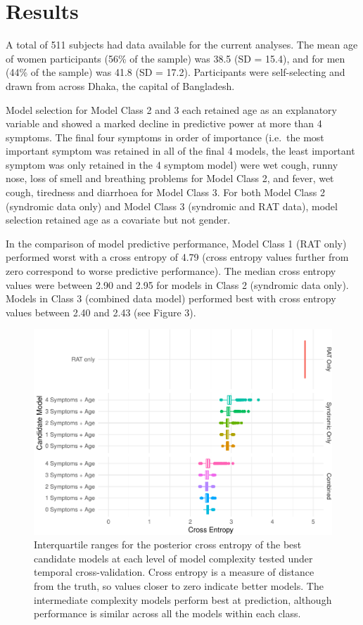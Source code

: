 \documentclass[]{elsarticle} %
\begin{document}
\hypertarget{results}{%
\section{Results}\label{results}}

A total of 511 subjects had data available for the current analyses. The
mean age of women participants (56\% of the sample) was 38.5 (SD =
15.4), and for men (44\% of the sample) was 41.8 (SD = 17.2).
Participants were self-selecting and drawn from across Dhaka, the
capital of Bangladesh.

Model selection for Model Class 2 and 3 each retained age as an
explanatory variable and showed a marked decline in predictive power at
more than 4 symptoms. The final four symptoms in order of importance
(i.e.~the most important symptom was retained in all of the final 4
models, the least important symptom was only retained in the 4 symptom
model) were wet cough, runny nose, loss of smell and breathing problems
for Model Class 2, and fever, wet cough, tiredness and diarrhoea for
Model Class 3. For both Model Class 2 (syndromic data only) and Model
Class 3 (syndromic and RAT data), model selection retained age as a
covariate but not gender.

In the comparison of model predictive performance, Model Class 1 (RAT
only) performed worst with a cross entropy of 4.79 (cross entropy values
further from zero correspond to worse predictive performance). The
median cross entropy values were between 2.90 and 2.95 for models in
Class 2 (syndromic data only). Models in Class 3 (combined data model)
performed best with cross entropy values between 2.40 and 2.43 (see
Figure 3).

\begin{figure}
\centering
\includegraphics{0501_MainText_files/figure-latex/pred-perf-1.pdf}
\caption{Interquartile ranges for the posterior cross entropy of the
best candidate models at each level of model complexity tested under
temporal cross-validation. Cross entropy is a measure of distance from
the truth, so values closer to zero indicate better models. The
intermediate complexity models perform best at prediction, although
performance is similar across all the models within each class.}
\end{figure}
\end{document}
